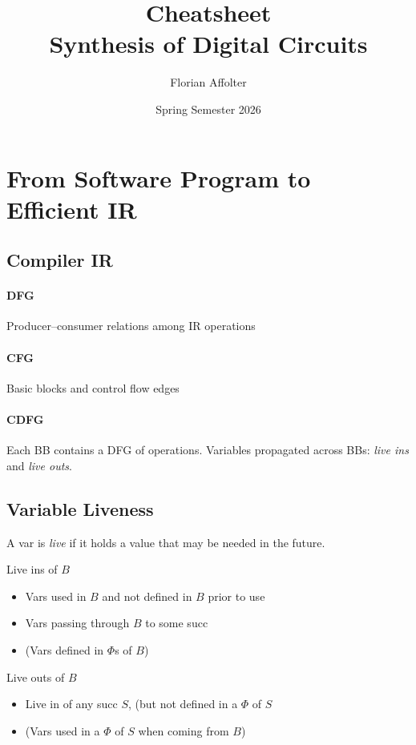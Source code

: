 \documentclass[a4paper]{article}
\title{Cheatsheet\\ Synthesis of Digital Circuits}
\author{Florian Affolter}
\date{\vspace{-10pt}Spring Semester 2026}
\begin{document}

% 

\small

\section{From Software Program to Efficient IR}

\subsection{Compiler IR}

\paragraph{DFG}
Producer--consumer relations among IR operations

\paragraph{CFG}
Basic blocks and control flow edges

\paragraph{CDFG}
Each BB contains a DFG of operations. Variables propagated across BBs: \emph{live ins} and \emph{live outs}.

\subsection{Variable Liveness}

A var is \emph{live} if it holds a value that may be needed in the future.

\begin{subbox}{Live ins of $B$}
    \begin{itemize}
        \item Vars used in $B$ and not defined in $B$ prior to use
        \item Vars passing through $B$ to some succ
        \item (Vars defined in $\Phi$s of $B$)
    \end{itemize}
\end{subbox}

\begin{subbox}{Live outs of $B$}
    \begin{itemize}
        \item Live in of any succ $S$, (but not defined in a $\Phi$ of $S$
        \item (Vars used in a $\Phi$ of $S$ when coming from $B$)
    \end{itemize}
\end{subbox}
\end{document}
